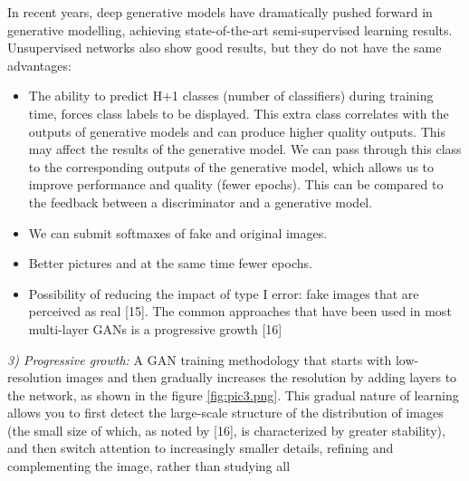 \documentclass[10pt, a4paper]{article}
\begin{document}
\begin{multicols}{2}
In recent years, deep generative models have dramatically pushed forward in generative modelling, achieving state-of-the-art semi-supervised learning results. Unsupervised networks also show good results, but they do not have the same advantages:
\begin{itemize}[left=1em] %
 \item The ability to predict H+1 classes (number of classifiers) during training time, forces class labels to be displayed. This extra class correlates with the outputs of generative models and can produce higher quality outputs. This may affect the results of the generative model. We can pass through this class to the corresponding outputs of the generative model, which allows us to improve performance and quality (fewer epochs). This can be compared to the feedback between a discriminator and a generative model.
 \item We can submit softmaxes of fake and original images.
 \item Better pictures and at the same time fewer epochs. 
 \item Possibility of reducing the impact of type I error:
fake images that are perceived as real [15].
The common approaches that have been used in most multi-layer GANs is a progressive growth [16]
\end{itemize}
\textit{3) Progressive growth:} A GAN training methodology that starts with low-resolution images and then gradually increases the resolution by adding layers to the network, as shown in the figure \ref{fig:pic3.png}. This gradual nature of learning allows you to first detect the large-scale structure of the distribution of images (the small size of which, as noted by [16], is characterized by greater stability), and then switch attention to increasingly smaller details, refining and complementing the image, rather than studying all
\end{multicols}
\newpage
\end{document}
